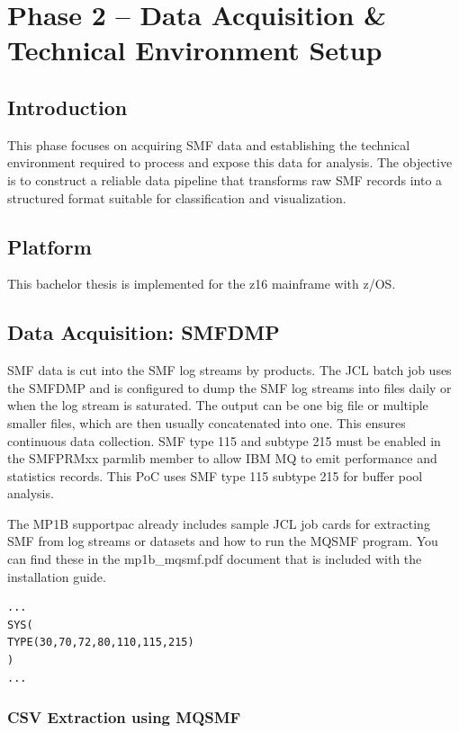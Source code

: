 
\chapter{Phase 2 – Data Acquisition \& Technical Environment Setup}
\label{ch:phase2}

\section{Introduction}

This phase focuses on acquiring SMF data and establishing the technical environment required to process and expose this data for analysis. The objective is to construct a reliable data pipeline that transforms raw SMF records into a structured format suitable for classification and visualization.

\section{Platform}

This bachelor thesis is implemented for the z16 mainframe with z/OS. 

\section{Data Acquisition: SMFDMP}
SMF data is cut into the SMF log streams by products. The JCL batch job uses the SMFDMP and is configured to dump the SMF log streams into files daily or when the log stream is saturated. The output can be one big file or multiple smaller files, which are then usually concatenated into one. This ensures continuous data collection. SMF type 115 and subtype 215 must be enabled in the SMFPRMxx parmlib member to allow IBM MQ to emit performance and statistics records. This PoC uses SMF type 115 subtype 215 for buffer pool analysis.

The MP1B supportpac already includes sample JCL job cards for extracting SMF from log streams or datasets and how to run the MQSMF program. You can find these in the mp1b\_mqsmf.pdf document that is included with the installation guide. 


\begin{listing}[H]
\caption{SMFPRMxx}
\label{lst:config-smfprmxx}
\begin{verbatim}
...
SYS(
TYPE(30,70,72,80,110,115,215)
)
...
\end{verbatim}
\end{listing}

\subsection{CSV Extraction using MQSMF}

